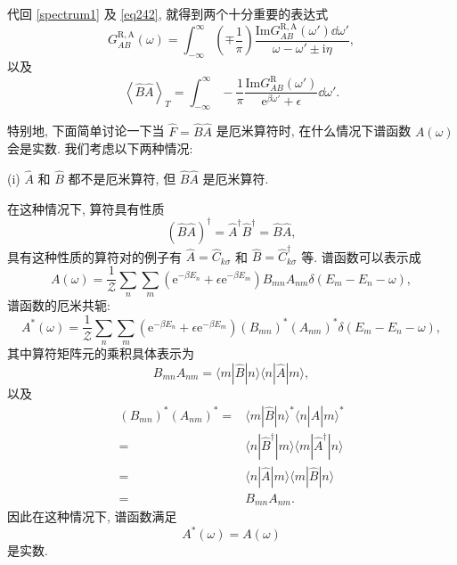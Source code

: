     代回 \eqref{spectrum1} 及 \eqref{eq242}, 就得到两个十分重要的表达式
    \begin{equation}
        \boxed{G_{AB}^{\mathrm{R,A}}(\omega)=\int_{-\infty}^{\infty}\left( \mp\frac{1}{\pi} \right) \frac{\mathrm{Im} G_{AB}^{\mathrm{R,A}}(\omega')\dd \omega'}{\omega-\omega'\pm \mathrm{i}\eta},}
    \end{equation}
    以及
    \begin{equation}
        \boxed{\left\langle \hat{B}\hat{A} \right\rangle_T=\int_{-\infty}^{\infty}-\frac{1}{\pi}\frac{\mathrm{Im}G_{AB}^{\mathrm{R}}(\omega')}{\mathrm{e}^{\beta\omega'}+\epsilon}\dd\omega'.}
    \end{equation}
    \begin{note}
        特别地, 下面简单讨论一下当 $\hat{F}=\hat{B}\hat{A}$ 是厄米算符时, 在什么情况下谱函数 $A(\omega)$ 会是实数. 我们考虑以下两种情况:
        
        (i) $\hat{A}$ 和 $\hat{B}$ 都不是厄米算符, 但 $\hat{B}\hat{A}$ 是厄米算符.

        在这种情况下, 算符具有性质
        \begin{equation}
            \left( \hat{B}\hat{A} \right)^\dagger =\hat{A}^\dagger \hat{B}^\dagger =\hat{B}\hat{A},
        \end{equation}
        具有这种性质的算符对的例子有 $\hat{A}=\hat{C}_{k\sigma}$ 和 $\hat{B}=\hat{C}_{k\sigma}^\dagger$ 等. 谱函数可以表示成
        \begin{equation}
            A(\omega)=\frac{1}{\mathcal{Z}}\sum_n\sum_m\left( \mathrm{e}^{-\beta E_n}+\epsilon \mathrm{e}^{-\beta E_m} \right) B_{mn}A_{nm}\delta\left( E_m-E_n-\omega \right),
        \end{equation}
        谱函数的厄米共轭:
        \begin{equation}
            A^*(\omega)=\frac{1}{\mathcal{Z}}\sum_n\sum_m\left( \mathrm{e}^{-\beta E_n}+\epsilon \mathrm{e}^{-\beta E_m} \right) (B_{mn})^* (A_{nm})^*\delta\left( E_m-E_n-\omega \right),
        \end{equation}
        其中算符矩阵元的乘积具体表示为
        \begin{equation}
            B_{mn}A_{nm}=\langle m|\hat{B}|n \rangle\langle n|\hat{A}|m \rangle,
        \end{equation}
        以及
     \begin{align}
                (B_{mn})^* (A_{nm})^*=&\langle m|\hat{B}|n \rangle^*\langle n|\hat{A}|m \rangle^*\nonumber\\
                =&\langle n|\hat{B}^\dagger |m \rangle \langle m|\hat{A}^\dagger |n \rangle\nonumber\\
                =&\langle n|\hat{A}|m \rangle\langle m|\hat{B}|n \rangle\nonumber\\
                =&B_{mn}A_{nm}.
     \end{align}
        因此在这种情况下, 谱函数满足
        \begin{equation}
            A^*(\omega)=A(\omega)
        \end{equation}
        是实数.


\end{note}

